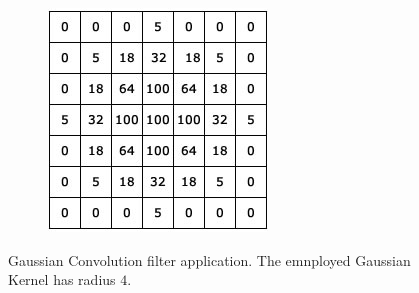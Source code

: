 \begin{figure}
    \endminipage\hfill
    \begin{subfigure}{0.9\textwidth}
        \includegraphics[width=\linewidth]{./images/opencal/conv-gaussian-blur}    
    \end{subfigure}
    \endminipage\hfill
    \caption{Gaussian Convolution filter application. The emnployed Gaussian Kernel has radius $4$.}
    \label{fig:gaussian}
\end{figure}


